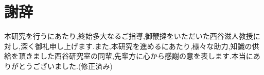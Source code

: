 \chapter*{謝辞} 
本研究を行うにあたり,終始多大なるご指導,御鞭撻をいただいた西谷滋人教授に対し,深く御礼申し上げます.また,本研究を進めるにあたり,様々な助力,知識の供給を頂きました西谷研究室の同輩,先輩方に心から感謝の意を表します.本当にありがとうございました.(修正済み)